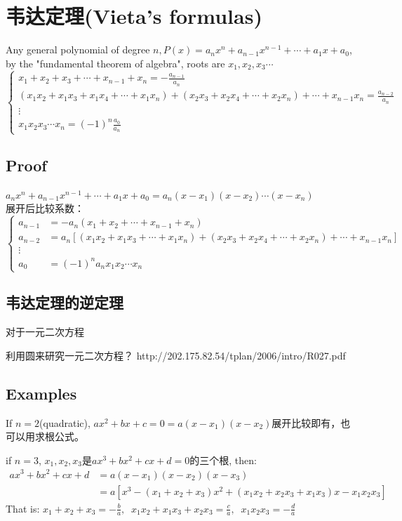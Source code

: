 \documentclass[../main.tex]{subfiles}
\begin{document}
\section{韦达定理(Vieta's formulas)}
Any general polynomial of degree $n, P(x)=a_{n}x^{n}+ a_{n-1}x^{n-1}+\cdots +a_1x+a_{0}$, by the "fundamental theorem of algebra", roots are $x_1, x_2, x_3\cdots$
\[
  \begin{cases}
    x_1+x_2+x_3+\cdots + x_{n-1}+ x_{n} = -\frac{a_{n-1}}{a_{n}}\\
    (x_1x_2+x_1x_3+x_1x_4+\cdots +x_1x_{n})+(x_2x_3+x_2x_4+\cdots +x_2x_{n})+\cdots + x_{n-1}x_{n} = \frac{a_{n-2}}{a_{n}}\\
    \vdots\\
    x_1x_2x_3\cdots x_{n} = (-1)^{n}\frac{a_{0}}{a_{n}}
  \end{cases}
\]

\subsection{Proof}
$a_{n}x^{n}+a_{n-1}x^{n-1}+\cdots + a_1x + a_{0} = a_{n}(x-x_1)(x-x_2)\cdots (x-x_{n}) $\\
展开后比较系数：\\
\[
  \left\{
    \begin{array}{ll}
      a_{n-1} &= -a_{n}(x_1+x_2+\cdots + x_{n-1}+ x_{n})\\
      a_{n-2} &= a_{n}[(x_1x_2+x_1x_3+\cdots +x_1x_{n})+ (x_2x_3+ x_2x_4+\cdots + x_2x_{n})+\cdots + x_{n-1}x_{n}]\\
      \vdots \\
      a_{0} &= (-1)^{n}a_{n}x_1x_2\cdots x_{n}
    \end{array}
  \right.
\]

\subsection{韦达定理的逆定理}
对于一元二次方程

利用圆来研究一元二次方程？  http://202.175.82.54/tplan/2006/intro/R027.pdf


\subsection{Examples}
If $n=2$(quadratic), $ax^2+bx+c=0 = a(x-x_1)(x-x_2)$展开比较即有，也可以用求根公式。

if $n=3$, $x_1, x_2, x_3$是$ax^3+bx^2+cx+d=0$的三个根, then:
\begin{align*}
  ax^3+bx^2+cx+d &= a(x-x_1)(x-x_2)(x-x_3)\\
                 &=a[x^3-(x_1+x_2+x_3)x^2+(x_1x_2+x_2x_3+x_1x_3)x- x_1x_2x_3]
\end{align*}
That is:
$x_1+x_2+x_3= -\frac{b}{a},\;\; x_1x_2+x_1x_3+x_2x_3=\frac{c}{a},\;\; x_1x_2x_3=-\frac{d}{a}$
\end{document}
